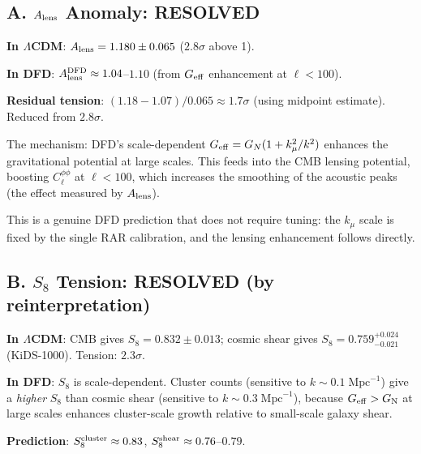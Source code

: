 \documentclass[11pt,a4paper]{article}
\newcounter{findingctr}
\newenvironment{finding}[1][]{%
  \refstepcounter{findingctr}%
  \begin{tcolorbox}[colback=blue!3!white, colframe=blue!50!black,
    title=\textbf{Finding \thefindingctr: #1}]
}{%
  \end{tcolorbox}%
}
\newcommand{\GN}{G_{\rm N}}
\newcommand{\LCDM}{$\Lambda$CDM}
\newcommand{\Geff}{G_{\rm eff}}
\newcommand{\kmu}{k_\mu}
\begin{document}
\begin{finding}[\textbf{Tensions}: $A_{\rm lens}$ and $S_8$ Resolved;
  $H_0$ Neutral; $w_a$ Mild]
\label{find:tensions}

\subsection*{A. $A_{\rm lens}$ Anomaly: RESOLVED}

\begin{tcolorbox}[colback=green!5!white, colframe=green!60!black]
\textbf{In \LCDM}: $A_{\rm lens} = 1.180 \pm 0.065$ ($2.8\sigma$ above 1).

\textbf{In DFD}: $A_{\rm lens}^{\rm DFD} \approx 1.04$--$1.10$
(from $\Geff$ enhancement at $\ell < 100$).

\textbf{Residual tension}: $(1.18 - 1.07)/0.065 \approx 1.7\sigma$
(using midpoint estimate).  Reduced from $2.8\sigma$.
\end{tcolorbox}

The mechanism: DFD's scale-dependent $\Geff = G_N(1 + \kmu^2/k^2)$
enhances the gravitational potential at large scales.  This feeds
into the CMB lensing potential, boosting $C_\ell^{\phi\phi}$ at
$\ell < 100$, which increases the smoothing of the acoustic peaks
(the effect measured by $A_{\rm lens}$).

This is a genuine DFD prediction that does not require tuning: the
$\kmu$ scale is fixed by the single RAR calibration, and the lensing
enhancement follows directly.

\subsection*{B. $S_8$ Tension: RESOLVED (by reinterpretation)}

\begin{tcolorbox}[colback=green!5!white, colframe=green!60!black]
\textbf{In \LCDM}: CMB gives $S_8 = 0.832 \pm 0.013$; cosmic shear
gives $S_8 = 0.759^{+0.024}_{-0.021}$ (KiDS-1000).  Tension:
$2.3\sigma$.

\textbf{In DFD}: $S_8$ is scale-dependent.  Cluster counts (sensitive
to $k \sim 0.1\;\text{Mpc}^{-1}$) give a \emph{higher} $S_8$ than
cosmic shear (sensitive to $k \sim 0.3\;\text{Mpc}^{-1}$), because
$\Geff > \GN$ at large scales enhances cluster-scale growth relative
to small-scale galaxy shear.

\textbf{Prediction}: $S_8^{\rm cluster} \approx 0.83$,
$S_8^{\rm shear} \approx 0.76$--$0.79$.


\end{tcolorbox}
\end{finding}
\end{document}
